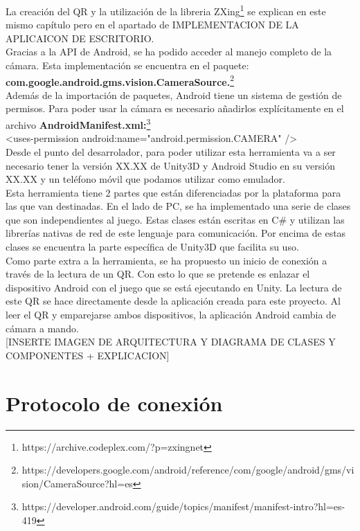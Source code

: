 La creaci\'on del QR y la utilizaci\'on de la libreria ZXing\footnote{https://archive.codeplex.com/?p=zxingnet} se explican en este mismo cap\'itulo pero en el apartado de  IMPLEMENTACION DE LA APLICAICON DE ESCRITORIO.
\\
Gracias a la API de Android, se ha podido acceder al manejo completo de la c\'amara. Esta implementaci\'on se encuentra en el paquete:\\ \textbf{com.google.android.gms.vision.CameraSource.}\footnote{https://developers.google.com/android/reference/com/google/android/gms/vision/CameraSource?hl=es}
\\
Adem\'as de la importaci\'on de paquetes, Android tiene un sistema de gesti\'on de permisos. Para poder usar la c\'amara es necesario a\~nadirlos expl\'icitamente en el archivo \textbf{AndroidManifest.xml:}\footnote{https://developer.android.com/guide/topics/manifest/manifest-intro?hl=es-419}
\\    <uses-permission android:name="android.permission.CAMERA" />\\


Desde el punto del desarrolador, para poder utilizar esta herramienta va a ser necesario tener la versi\'on XX.XX de Unity3D y Android Studio en su versi\'on XX.XX y un tel\'efono m\'ovil que podamos utilizar como emulador.
\\
Esta herramienta tiene 2 partes que est\'an diferenciadas por la plataforma para las que van destinadas. En el lado de PC, se ha implementado una serie de clases que son independientes al juego. 
Estas clases est\'an escritas en C\# y utilizan las librer\'ias  nativas de red de este lenguaje para comunicaci\'on. Por encima de estas clases se encuentra la parte espec\'ifica de Unity3D que facilita su uso. 
\\
Como parte extra a la herramienta, se ha propuesto un inicio de conexi\'on a trav\'es de la lectura de un QR. Con esto lo que se pretende es enlazar el dispositivo Android con el juego que se est\'a ejecutando en Unity. 
La lectura de este QR se hace directamente desde la aplicaci\'on creada para este proyecto. Al leer el QR y emparejarse ambos dispositivos, la aplicaci\'on Android cambia de c\'amara a mando.
\\

[INSERTE IMAGEN DE ARQUITECTURA Y DIAGRAMA DE CLASES Y COMPONENTES  + EXPLICACION]


\section{Protocolo de conexi\'on}
\label{cap4:sec:protocolo}

